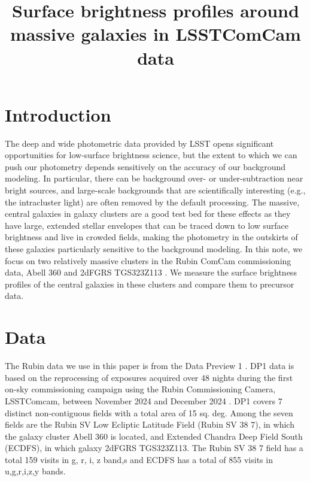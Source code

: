 \documentclass[SE,lsstdraft,authoryear,toc]{lsstdoc}
\title{Surface brightness profiles around massive galaxies in LSSTComCam data}
\date{\vcsDate}
\begin{document}
\maketitle


\section{Introduction}
The deep and wide photometric data provided by LSST opens significant opportunities for low-surface brightness science, but the extent to which we can push our photometry depends sensitively on the accuracy of our background modeling. In particular, there can be background over- or under-subtraction near bright sources, and large-scale backgrounds that are scientifically interesting (e.g., the intracluster light) are often removed by the default processing. The massive, central galaxies in galaxy clusters are a good test bed for these effects as they have large, extended stellar envelopes that can be traced down to low surface brightness and live in crowded fields, making the photometry in the outskirts of these galaxies particularly sensitive to the background modeling.
In this note, we focus on two relatively massive clusters in the Rubin ComCam commissioning data, Abell 360 and 2dFGRS TGS323Z113 . We measure the surface brightness profiles of the central galaxies in these clusters and compare them to precursor data.

\section{Data}
The Rubin data we use in this paper is from the Data Preview 1 \citep[DP1;][]{RTN-095}. DP1 data is based on the reprocessing of exposures acquired over 48 nights during the first on-sky commissioning campaign using the Rubin Commissioning Camera, LSSTComcam, between November 2024 and December 2024 \citep{10.71929/RUBIN/2561361}. DP1 covers 7 distinct non-contiguous fields with a total area of 15 sq. deg. Among the seven fields are the Rubin SV Low Ecliptic Latitude Field (Rubin SV 38 7), in which the galaxy cluster Abell 360 is located, and Extended Chandra Deep Field South (ECDFS), in which galaxy 2dFGRS TGS323Z113. The Rubin SV 38 7 field has a total 159 visits in g, r, i, z band,s and ECDFS has a total of 855 visits in u,g,r,i,z,y bands.
\end{document}
